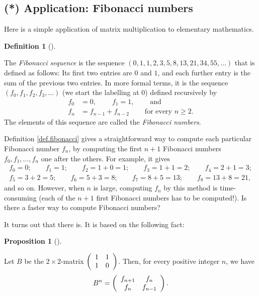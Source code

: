 \documentclass[numbers=enddot,12pt,final,onecolumn,notitlepage]{scrartcl}%
\theoremstyle{definition}
\newtheorem{prop}[theo]{Proposition}
\newenvironment{proposition}[1][]
{\begin{prop}[#1]\begin{leftbar}}
{\end{leftbar}\end{prop}}
\newtheorem{defi}[theo]{Definition}
\newenvironment{definition}[1][]
{\begin{defi}[#1]\begin{leftbar}}
{\end{leftbar}\end{defi}}
\begin{document}
\subsection{(*) Application: Fibonacci numbers}

Here is a simple application of matrix multiplication to elementary mathematics.

\begin{definition}
\label{def.fibonacci}The \textit{Fibonacci sequence} is the sequence $\left(
0,1,1,2,3,5,8,13,21,34,55,\ldots\right)  $ that is defined as follows: Its
first two entries are $0$ and $1$, and each further entry is the sum of the
previous two entries. In more formal terms, it is the sequence $\left(
f_{0},f_{1},f_{2},f_{3},\ldots\right)  $ (we start the labelling at $0$)
defined recursively by%
\begin{align*}
f_{0}  &  =0,\ \ \ \ \ \ \ \ \ \ f_{1}=1,\ \ \ \ \ \ \ \ \ \ \text{and}\\
f_{n}  &  =f_{n-1}+f_{n-2}\ \ \ \ \ \ \ \ \ \ \text{for every }n\geq2.
\end{align*}
The elements of this sequence are called the \textit{Fibonacci numbers}.
\end{definition}

Definition \ref{def.fibonacci} gives a straightforward way to compute each
particular Fibonacci number $f_{n}$, by computing the first $n+1$ Fibonacci
numbers $f_{0},f_{1},\ldots,f_{n}$ one after the others. For example, it
gives
\begin{align*}
f_{0} = 0; \qquad f_{1} = 1; \qquad f_{2} = 1+0 = 1; \qquad f_{3} = 1+1 = 2;
\qquad f_{4} = 2+1 = 3;\\
f_{5} = 3+2 = 5; \qquad f_{6} = 5+3 = 8; \qquad f_{7} = 8+5 = 13; \qquad f_{8}
= 13+8 = 21,
\end{align*}
and so on. However, when $n$ is large, computing $f_{n}$ by this method is
time-consuming (each of the $n+1$ first Fibonacci numbers has to be
computed!). Is there a faster way to compute Fibonacci numbers?

It turns out that there is. It is based on the following fact:

\begin{proposition}
\label{prop.fibonacci.matrix}Let $B$ be the $2\times2$-matrix $\left(
\begin{array}
[c]{cc}%
1 & 1\\
1 & 0
\end{array}
\right)  $. Then, for every positive integer $n$, we have%
\begin{equation}
B^{n}=\left(
\begin{array}
[c]{cc}%
f_{n+1} & f_{n}\\
f_{n} & f_{n-1}%
\end{array}
\right)  . \label{eq.prop.fibonacci.matrix.1}%
\end{equation}

\end{proposition}
\end{document}
